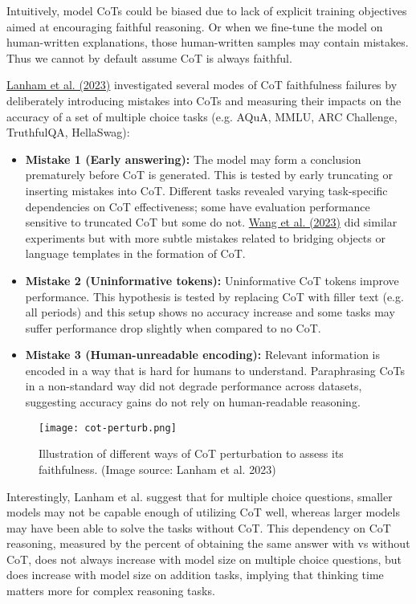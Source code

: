\documentclass[12pt]{article}
\begin{document}
Intuitively, model CoTs could be biased due to lack of explicit training objectives aimed at encouraging faithful reasoning. Or when we fine-tune the model on human-written explanations, those human-written samples may contain mistakes. Thus we cannot by default assume CoT is always faithful.

\href{https://arxiv.org/abs/2307.13702}{Lanham et al. (2023)} investigated several modes of CoT faithfulness failures by deliberately introducing mistakes into CoTs and measuring their impacts on the accuracy of a set of multiple choice tasks (e.g. AQuA, MMLU, ARC Challenge, TruthfulQA, HellaSwag):

\begin{itemize}
    \item \textbf{Mistake 1 (Early answering):} The model may form a conclusion prematurely before CoT is generated. This is tested by early truncating or inserting mistakes into CoT. Different tasks revealed varying task-specific dependencies on CoT effectiveness; some have evaluation performance sensitive to truncated CoT but some do not. \href{https://arxiv.org/abs/2212.10001}{Wang et al. (2023)} did similar experiments but with more subtle mistakes related to bridging objects or language templates in the formation of CoT.
    \item \textbf{Mistake 2 (Uninformative tokens):} Uninformative CoT tokens improve performance. This hypothesis is tested by replacing CoT with filler text (e.g. all periods) and this setup shows no accuracy increase and some tasks may suffer performance drop slightly when compared to no CoT.
    \item \textbf{Mistake 3 (Human-unreadable encoding):} Relevant information is encoded in a way that is hard for humans to understand. Paraphrasing CoTs in a non-standard way did not degrade performance across datasets, suggesting accuracy gains do not rely on human-readable reasoning.
\end{itemize}

\begin{figure}[h]
    \centering
    \texttt{[image: cot-perturb.png]}
    \caption{Illustration of different ways of CoT perturbation to assess its faithfulness. (Image source: Lanham et al. 2023)}
\end{figure}

Interestingly, Lanham et al. suggest that for multiple choice questions, smaller models may not be capable enough of utilizing CoT well, whereas larger models may have been able to solve the tasks without CoT. This dependency on CoT reasoning, measured by the percent of obtaining the same answer with vs without CoT, does not always increase with model size on multiple choice questions, but does increase with model size on addition tasks, implying that thinking time matters more for complex reasoning tasks.
\end{document}
